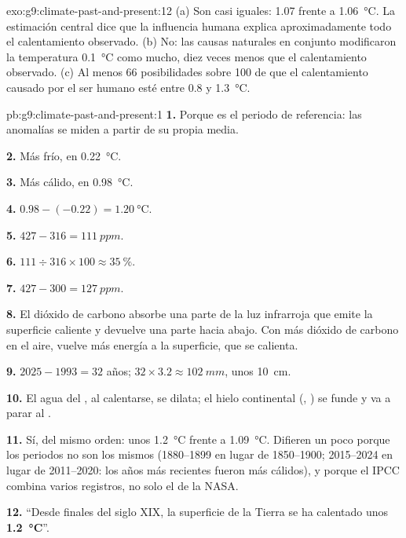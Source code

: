 \begin{solution}{exo:g9:climate-past-and-present:12}
(a) Son casi iguales: 1.07 frente a \qty{1.06}{\degreeCelsius}. La
estimación central dice que la influencia humana explica aproximadamente
todo el calentamiento observado. (b) No: las causas naturales en conjunto
modificaron la temperatura \qty{0.1}{\degreeCelsius} como mucho, diez
veces menos que el calentamiento observado. (c) Al menos 66 posibilidades
sobre 100 de que el calentamiento causado por el ser humano esté entre
0.8 y \qty{1.3}{\degreeCelsius}.
\end{solution}

\begin{solution}{pb:g9:climate-past-and-present:1}
\textbf{1.} Porque es el periodo de referencia: las anomalías se miden a
partir de su propia media.

\textbf{2.} Más frío, en \qty{0.22}{\degreeCelsius}.

\textbf{3.} Más cálido, en \qty{0.98}{\degreeCelsius}.

\textbf{4.} $0.98 - (-0.22) = \qty{1.20}{\degreeCelsius}$.

\textbf{5.} $427 - 316 = \qty{111}{ppm}$.

\textbf{6.} $111 \div 316 \times 100 \approx 35~\%$.

\textbf{7.} $427 - 300 = \qty{127}{ppm}$.

\textbf{8.} El dióxido de carbono absorbe una parte de la luz infrarroja
que emite la superficie caliente y devuelve una parte hacia abajo. Con más
dióxido de carbono en el aire, vuelve más energía a la superficie, que se
calienta.

\textbf{9.} $2025 - 1993 = 32$ años; $32 \times 3.2 \approx
\qty{102}{mm}$, unos \qty{10}{cm}.

\textbf{10.} El agua del , al calentarse, se dilata; el hielo
continental (, ) se funde y va a parar al .

\textbf{11.} Sí, del mismo orden: unos \qty{1.2}{\degreeCelsius} frente a
\qty{1.09}{\degreeCelsius}. Difieren un poco porque los periodos no son
los mismos (1880--1899 en lugar de 1850--1900; 2015--2024 en lugar de
2011--2020: los años más recientes fueron más cálidos), y porque el IPCC
combina varios registros, no solo el de la NASA.

\textbf{12.} ``Desde finales del siglo XIX, la superficie de la Tierra se
ha calentado unos \textbf{\qty{1.2}{\degreeCelsius}}''.
\end{solution}
